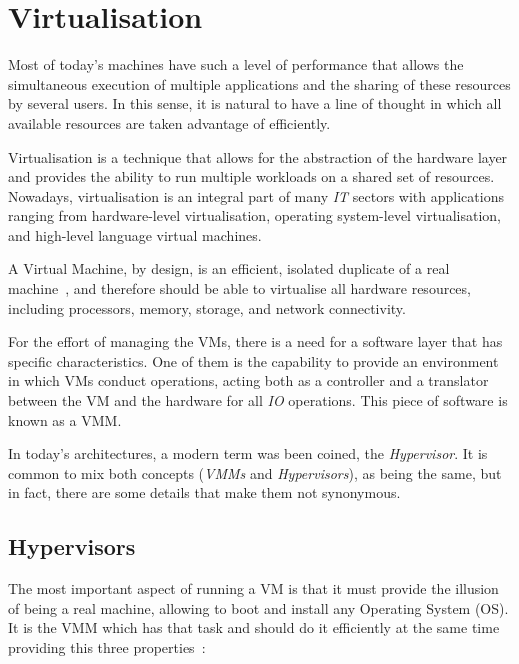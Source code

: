 \section{Virtualisation}
\label{sec:virtualisation}

Most of today's machines have such a level of performance that allows the simultaneous execution of multiple applications and the sharing of these resources by several users. In this sense, it is natural to have a line of thought in which all available resources are taken advantage of efficiently.

Virtualisation is a technique that allows for the abstraction of the hardware layer and provides the ability to run multiple workloads on a shared set of resources. Nowadays, virtualisation is an integral part of many \textit{IT} sectors with applications ranging from hardware-level virtualisation, operating system-level virtualisation, and high-level language virtual machines.
\nocite{VMware_VM2006}

A Virtual Machine, by design, is an efficient, isolated duplicate of a real machine~\cite{Popek1974}, and therefore should be able to virtualise all hardware resources, including processors, memory, storage, and network connectivity.

For the effort of managing the VMs, there is a need for a software layer that has specific characteristics. One of them is the capability to provide an environment in which VMs conduct operations, acting both as a controller and a translator between the VM and the hardware for all \textit{IO} operations. This piece of software is known as a \gls{VMM}.

In today's architectures, a modern term was been coined, the \textit{Hypervisor}. It is common to mix both concepts (\textit{VMMs} and \textit{Hypervisors}), as being the same, but in fact, there are some details that make them not synonymous.~\cite{Agesen2010}

\subsection{Hypervisors} %
\label{sub:hypervisors}

The most important aspect of running a VM is that it must provide the illusion of being a real machine, allowing to boot and install any Operating System (OS). It is the VMM which has that task and should do it efficiently at the same time providing this three properties~\cite{Popek1974}:

